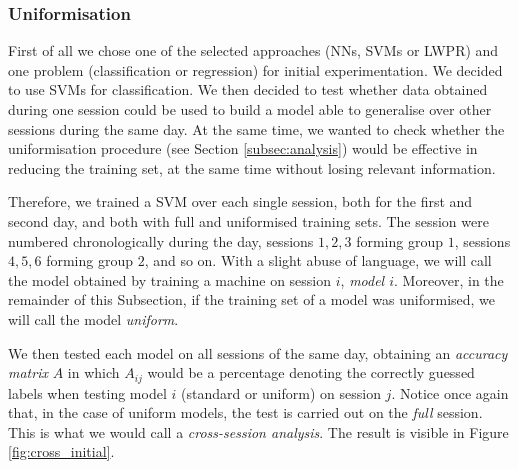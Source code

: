 %

\subsubsection{Uniformisation}

First of all we chose one of the selected approaches (NNs, SVMs or
LWPR) and one problem (classification or regression) for initial
experimentation. We decided to use SVMs for classification. We then
decided to test whether data obtained during one session could be used
to build a model able to generalise over other sessions during the
same day. At the same time, we wanted to check whether the
uniformisation procedure (see Section \ref{subsec:analysis}) would be
effective in reducing the training set, at the same time without
losing relevant information.

Therefore, we trained a SVM over each single session, both for the
first and second day, and both with full and uniformised training
sets. The session were numbered chronologically during the day,
sessions $1,2,3$ forming group $1$, sessions $4,5,6$ forming group
$2$, and so on. With a slight abuse of language, we will call the
model obtained by training a machine on session $i$, \emph{model
$i$}. Moreover, in the remainder of this Subsection, if the training
set of a model was uniformised, we will call the model \emph{uniform}.

We then tested each model on all sessions of the same day, obtaining
an \emph{accuracy matrix} $A$ in which $A_{ij}$ would be a percentage
denoting the correctly guessed labels when testing model $i$ (standard
or uniform) on session $j$. Notice once again that, in the case of
uniform models, the test is carried out on the \emph{full}
session. This is what we would call a \emph{cross-session analysis}.
The result is visible in Figure \ref{fig:cross_initial}.

